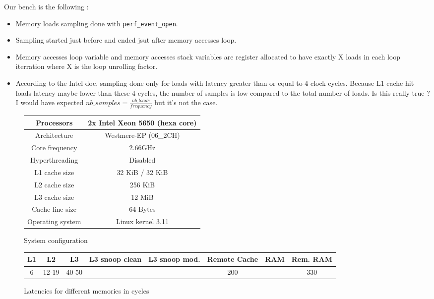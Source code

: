 \documentclass[10pt,a4paper]{article}
\begin{document}
Our bench is the following :
\begin{itemize}
\item Memory loads sampling done with \texttt{perf\_event\_open}.
\item  Sampling  started  just  before and  ended  jsut  after  memory
  accesses loop.
\item  Memory  accesses  loop   variable  and  memory  accesses  stack
  variables are  register allocated  to have exactly  X loads  in each
  loop iterration where X is the loop unrolling factor.
\item According  to the Intel doc,  sampling done only for  loads with
  latency greater  than or equal to  4 clock cycles. Because  L1 cache
  hit loads  latency maybe lower  than these  4 cycles, the  number of
  samples is low compared to the total number of loads. Is this really
  true    ?      I    would     have    expected     $nb\_samples    =
  \frac{nb\_loads}{frequency}$ but it's not the case.
\end{itemize}

\begin{figure}[h]
  \centering
  \begin{tabular}[h]{|c|c|}
    \hline
    Processors       & 2x Intel Xeon 5650 (hexa core) \\
    \hline
    Architecture     & Westmere-EP (06\_2CH)          \\
    \hline
    Core frequency   & 2.66GHz                        \\
    \hline
    Hyperthreading   & Disabled                       \\
    \hline
    L1 cache size    & 32 KiB / 32 KiB                \\
     \hline
    L2 cache size    & 256 KiB                        \\
    \hline
    L3 cache size    & 12 MiB                         \\
    \hline
    Cache line size  & 64 Bytes                       \\
    \hline
    Operating system & Linux kernel 3.11              \\
    \hline
  \end{tabular}
  \caption{System configuration}
  \label{tab:config}
\end{figure}

\begin{figure}[h]
  \begin{tabular}{|c|c|c|c|c|c|c|c|}
    \hline
    L1 & L2    & L3    & L3 snoop clean & L3 snoop mod. & Remote Cache & RAM & Rem. RAM \\
    \hline
    6  & 12-19 & 40-50 &                &               & 200          &     & 330      \\
    \hline
  \end{tabular}
  \caption{Latencies for different memories in cycles}
\end{figure}
\end{document}
